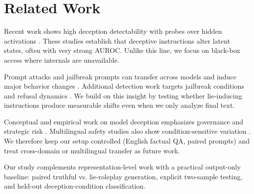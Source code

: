 \section{Related Work}
\label{sec:related}

Recent work shows high deception detectability with probes over hidden activations \citep{goldowskydill2025detecting,long2025truthful}. These studies establish that deceptive instructions alter latent states, often with very strong AUROC. Unlike this line, we focus on black-box access where internals are unavailable.

Prompt attacks and jailbreak prompts can transfer across models and induce major behavior changes \citep{qiu2023latent,wei2023opensesame}. Additional detection work targets jailbreak conditions and refusal dynamics \citep{ye2024gradient}. We build on this insight by testing whether lie-inducing instructions produce measurable shifts even when we only analyze final text.

Conceptual and empirical work on model deception emphasizes governance and strategic risk \citep{dey2024unmasking,geifman2024assessment}. Multilingual safety studies also show condition-sensitive variation \citep{casadei2023all}. We therefore keep our setup controlled (English factual QA, paired prompts) and treat cross-domain or multilingual transfer as future work.

Our study complements representation-level work with a practical output-only baseline: paired truthful vs.
lie-roleplay generation, explicit two-sample testing, and held-out deception-condition classification.
